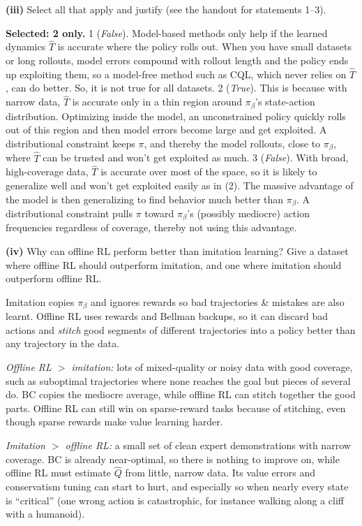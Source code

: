 \documentclass[11pt]{article}
\begin{document}
\textbf{(iii)} Select all that apply and justify (see the handout for statements 1--3).
\begin{answer}[height=6cm]
  \small
  \textbf{Selected: 2 only.}
  1 (\emph{False}). Model-based methods only help if the learned dynamics $\hat T$ is accurate where the policy rolls out. When you have small datasets or long rollouts, model errors compound with rollout length and the policy ends up exploiting them, so a model-free method such as CQL, which never relies on $\hat T$, can do better. So, it is not true for all datasets.
  2 (\emph{True}). This is because with narrow data, $\hat T$ is accurate only in a thin region around $\pi_\beta$'s state-action distribution. Optimizing inside the model, an unconstrained policy quickly rolls out of this region and then model errors become large and get exploited. A distributional constraint keeps $\pi$, and thereby the model rollouts, close to $\pi_\beta$, where $\hat T$ can be trusted and won't get exploited as much.
  3 (\emph{False}). With broad, high-coverage data, $\hat T$ is accurate over most of the space, so it is likely to generalize well and won't get exploited easily as in (2). The massive advantage of the model is then generalizing to find behavior much better than $\pi_\beta$. A distributional constraint pulls $\pi$ toward $\pi_\beta$'s (possibly mediocre) action frequencies regardless of coverage, thereby not using this advantage.
\end{answer}

\textbf{(iv)} Why can offline RL perform better than imitation learning? Give a dataset where offline RL should outperform imitation, and one where imitation should outperform offline RL.
\begin{answer}[height=6cm]
  \small
  Imitation copies $\pi_\beta$ and ignores rewards so bad trajectories \& mistakes are also learnt. Offline RL uses rewards and Bellman backups, so it can discard bad actions and \emph{stitch} good segments of different trajectories into a policy better than any trajectory in the data.\par
  \emph{Offline RL $>$ imitation:} lots of mixed-quality or noisy data with good coverage, such as suboptimal trajectories where none reaches the goal but pieces of several do. BC copies the mediocre average, while offline RL can stitch together the good parts. Offline RL can still win on sparse-reward tasks because of stitching, even though sparse rewards make value learning harder.\par
  \emph{Imitation $>$ offline RL:} a small set of clean expert demonstrations with narrow coverage. BC is already near-optimal, so there is nothing to improve on, while offline RL must estimate $\hat Q$ from little, narrow data. Its value errors and conservatism tuning can start to hurt, and especially so when nearly every state is ``critical'' (one wrong action is catastrophic, for instance walking along a cliff with a humanoid).
\end{answer}
\end{document}
